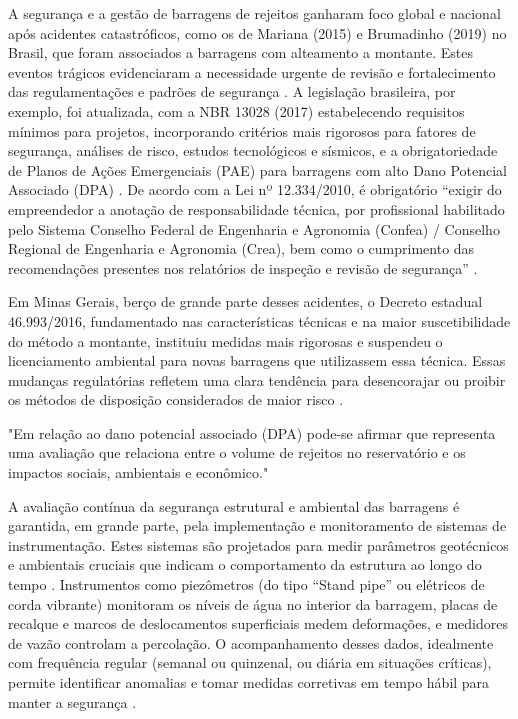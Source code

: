 A segurança e a gestão de barragens de rejeitos ganharam foco global e nacional após acidentes catastróficos, como os de Mariana (2015) e Brumadinho (2019) no Brasil, que foram associados a barragens com alteamento a montante. Estes eventos trágicos evidenciaram a necessidade urgente de revisão e fortalecimento das regulamentações e padrões de segurança \cite{warzynski2023}. A legislação brasileira, por exemplo, foi atualizada, com a NBR 13028 (2017) estabelecendo requisitos mínimos para projetos, incorporando critérios mais rigorosos para fatores de segurança, análises de risco, estudos tecnológicos e sísmicos, e a obrigatoriedade de Planos de Ações Emergenciais (PAE) para barragens com alto Dano Potencial Associado (DPA) \cite{desouzaaraujo2018}. De acordo com a Lei nº 12.334/2010, é obrigatório ``exigir do empreendedor a anotação de responsabilidade técnica, por profissional habilitado pelo Sistema Conselho Federal de Engenharia e Agronomia (Confea) / Conselho Regional de Engenharia e Agronomia (Crea), bem como o cumprimento das recomendações presentes nos relatórios de inspeção e revisão de segurança'' \cite{brasil2010pnsb}.

Em Minas Gerais, berço de grande parte desses acidentes, o Decreto estadual 46.993/2016, fundamentado nas características técnicas e na maior suscetibilidade do método a montante, instituiu medidas mais rigorosas e suspendeu o licenciamento ambiental para novas barragens que utilizassem essa técnica. Essas mudanças regulatórias refletem uma clara tendência para desencorajar ou proibir os métodos de disposição considerados de maior risco \cite{ibram2016, thome2018}.

"Em relação ao dano potencial associado (DPA) pode-se afirmar que representa uma avaliação que relaciona entre o volume de rejeitos no reservatório e os impactos sociais, ambientais e econômico." \cite{desouzajunior2018}

A avaliação contínua da segurança estrutural e ambiental das barragens é garantida, em grande parte, pela implementação e monitoramento de sistemas de instrumentação. Estes sistemas são projetados para medir parâmetros geotécnicos e ambientais cruciais que indicam o comportamento da estrutura ao longo do tempo \cite{soares2010}. Instrumentos como piezômetros (do tipo ``Stand pipe'' ou elétricos de corda vibrante) monitoram os níveis de água no interior da barragem, placas de recalque e marcos de deslocamentos superficiais medem deformações, e medidores de vazão controlam a percolação. O acompanhamento desses dados, idealmente com frequência regular (semanal ou quinzenal, ou diária em situações críticas), permite identificar anomalias e tomar medidas corretivas em tempo hábil para manter a segurança \cite{soares2010, desouzajunior2018}.

